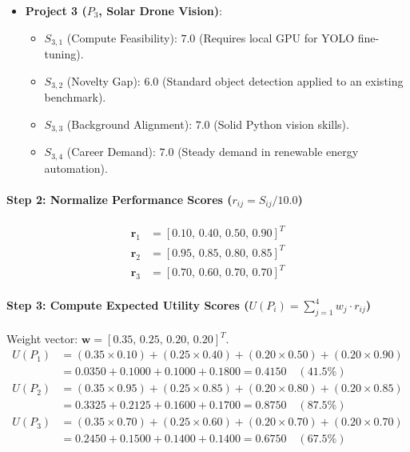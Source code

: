 \begin{example}
\begin{itemize}
\begin{itemize}
    \end{itemize}
    \item \textbf{Project 3 ($P_3$, Solar Drone Vision)}:
    \begin{itemize}
        \item $S_{3,1}$ (Compute Feasibility): $7.0$ (Requires local GPU for YOLO fine-tuning).
        \item $S_{3,2}$ (Novelty Gap): $6.0$ (Standard object detection applied to an existing benchmark).
        \item $S_{3,3}$ (Background Alignment): $7.0$ (Solid Python vision skills).
        \item $S_{3,4}$ (Career Demand): $7.0$ (Steady demand in renewable energy automation).
    \end{itemize}
\end{itemize}

\paragraph{Step 2: Normalize Performance Scores ($r_{ij} = S_{ij} / 10.0$)}
\begin{align*}
\mathbf{r}_1 &= [0.10, \, 0.40, \, 0.50, \, 0.90]^T \\
\mathbf{r}_2 &= [0.95, \, 0.85, \, 0.80, \, 0.85]^T \\
\mathbf{r}_3 &= [0.70, \, 0.60, \, 0.70, \, 0.70]^T
\end{align*}

\paragraph{Step 3: Compute Expected Utility Scores ($U(P_i) = \sum_{j=1}^4 w_j \cdot r_{ij}$)}
Weight vector: $\mathbf{w} = [0.35, \, 0.25, \, 0.20, \, 0.20]^T$.
\begin{align*}
U(P_1) &= (0.35 \times 0.10) + (0.25 \times 0.40) + (0.20 \times 0.50) + (0.20 \times 0.90) \\
&= 0.0350 + 0.1000 + 0.1000 + 0.1800 = \mathbf{0.4150} \quad (41.5\%) \\[2mm]
U(P_2) &= (0.35 \times 0.95) + (0.25 \times 0.85) + (0.20 \times 0.80) + (0.20 \times 0.85) \\
&= 0.3325 + 0.2125 + 0.1600 + 0.1700 = \mathbf{0.8750} \quad (87.5\%) \\[2mm]
U(P_3) &= (0.35 \times 0.70) + (0.25 \times 0.60) + (0.20 \times 0.70) + (0.20 \times 0.70) \\
&= 0.2450 + 0.1500 + 0.1400 + 0.1400 = \mathbf{0.6750} \quad (67.5\%)
\end{align*}


\end{example}
